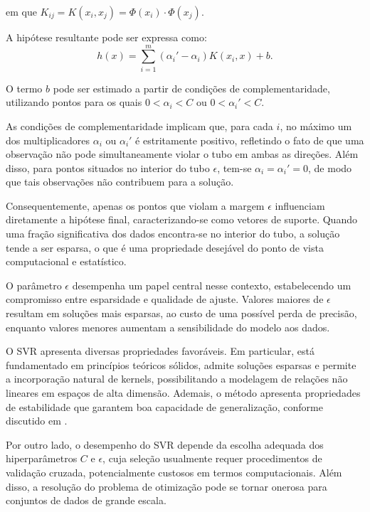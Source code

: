 em que $K_{ij} = K(x_i, x_j) = \Phi(x_i) \cdot \Phi(x_j)$.

A hipótese resultante pode ser expressa como:
\begin{equation}
h(x) = \sum_{i=1}^{m} (\alpha_i' - \alpha_i) K(x_i, x) + b.
\end{equation}

O termo $b$ pode ser estimado a partir de condições de complementaridade,
utilizando pontos para os quais $0 < \alpha_i < C$ ou $0 < \alpha_i' < C$.

As condições de complementaridade implicam que, para cada $i$, no máximo um dos
multiplicadores $\alpha_i$ ou $\alpha_i'$ é estritamente positivo, refletindo o fato
de que uma observação não pode simultaneamente violar o tubo em ambas as direções.
Além disso, para pontos situados no interior do tubo $\epsilon$, tem-se
$\alpha_i = \alpha_i' = 0$, de modo que tais observações não contribuem para a solução.

Consequentemente, apenas os pontos que violam a margem $\epsilon$ influenciam
diretamente a hipótese final, caracterizando-se como vetores de suporte. Quando uma
fração significativa dos dados encontra-se no interior do tubo, a solução tende a ser
esparsa, o que é uma propriedade desejável do ponto de vista computacional e estatístico.

O parâmetro $\epsilon$ desempenha um papel central nesse contexto, estabelecendo um
compromisso entre esparsidade e qualidade de ajuste. Valores maiores de $\epsilon$
resultam em soluções mais esparsas, ao custo de uma possível perda de precisão, enquanto
valores menores aumentam a sensibilidade do modelo aos dados.

O SVR apresenta diversas propriedades favoráveis. Em particular, está fundamentado em
princípios teóricos sólidos, admite soluções esparsas e permite a incorporação natural
de kernels, possibilitando a modelagem de relações não lineares em espaços de alta
dimensão. Ademais, o método apresenta propriedades de estabilidade que garantem boa
capacidade de generalização, conforme discutido em .

Por outro lado, o desempenho do SVR depende da escolha adequada dos hiperparâmetros
$C$ e $\epsilon$, cuja seleção usualmente requer procedimentos de validação cruzada,
potencialmente custosos em termos computacionais. Além disso, a resolução do problema
de otimização pode se tornar onerosa para conjuntos de dados de grande escala.

